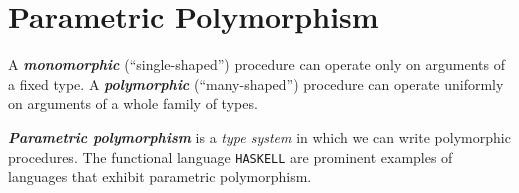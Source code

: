 \section{Parametric Polymorphism}
\label{sec:param-polymorp}

A \textit{\textbf{monomorphic}} (``single-shaped'') procedure can operate only on arguments of a fixed type. A \textit{\textbf{polymorphic}} (``many-shaped'') procedure can operate uniformly on arguments of a whole family of types.

\noindent \textit{\textbf{Parametric polymorphism}} is a \textit{type system} in which we can write polymorphic procedures. The functional language \texttt{HASKELL} are prominent examples of languages that exhibit parametric polymorphism. 






